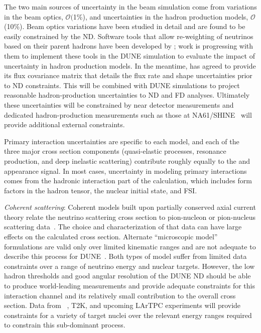 
The two main sources of uncertainty in the beam simulation come from variations in the beam optics,
$\mathcal{O}($1\%), and uncertainties in the hadron production models, $\mathcal{O}$(10\%).
Beam optics variations have been studied in detail
and are found to be easily constrained by the ND. Software tools that
allow re-weighting of neutrinos based on their parent hadrons have been developed by \minerva; work is progressing with
them to implement these tools in the DUNE simulation to evaluate the impact of uncertainty in
hadron production models.
In the meantime, \minerva has agreed to provide its flux covariance matrix
that details the flux rate and shape uncertainties prior to ND constraints. This will be combined with DUNE
simulations to project reasonable hadron-production uncertainties to ND and FD analyses. 
Ultimately these uncertainties will be constrained by near detector measurements and
dedicated hadron-production measurements such as those at NA61/SHINE~\cite{NA61:2014fnalbeams}
will provide additional external constraints.

Primary interaction uncertainties are specific to each model, and each of the three major
cross section components (quasi-elastic processes, resonance production, and deep inelastic scattering)
contribute roughly equally to the \nue and \anue
appearance signal. In most cases, uncertainty in modeling primary interactions comes from the
hadronic interaction part of the calculation, which includes form factors in the hadron tensor,
the nuclear initial state, and FSI. 

  \emph{Coherent scattering}: Coherent models built upon partially conserved axial current
  theory relate the neutrino scattering 
  cross section to pion-nucleon or pion-nucleus scattering data~\cite{Rein-Sehgal:1983}\cite{Berger-Sehgal:2009}. The choice and characterization
  of that data can have large effects on the calculated cross section. Alternate ``microscopic model'' 
  formulations are valid only over limited kinematic ranges and are not adequate to describe this process 
  for DUNE~\cite{Alvarez-Ruso-Geng-Hirenzaki-Vicente-Vacas:2007}\cite{Alvarez-Ruso-Geng-Vicente-Vacas:2007}. 
  Both types of model suffer from limited data constraints over a range of neutrino energy
  and nuclear targets. 
  However, the low hadron thresholds and good angular resolution of the DUNE ND should be able
  to produce world-leading measurements and provide adequate constraints for this interaction channel and 
  its relatively small contribution to the overall cross section. Data from \minerva~\cite{Higuera:2014azj},
  T2K, and
  upcoming LArTPC experiments will provide constraints for a variety of target nuclei over the
  relevant energy ranges required to constrain this sub-dominant process.

